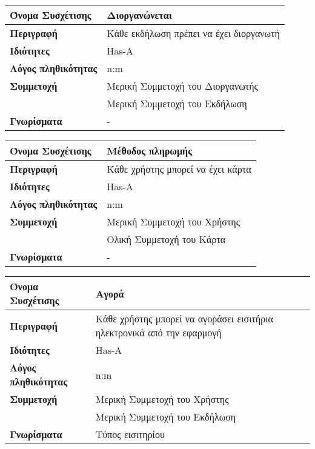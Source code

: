 \begin{center}
\begin{tabular}[]{|p{4cm}|p{10cm}|}
  \hline
  \textbf{Όνομα Συσχέτισης} & Διοργανώνεται\\  \hline
  \textbf{Περιγραφή} & Κάθε εκδήλωση πρέπει να έχει διοργανωτή\\ \hline
  \textbf{Ιδιότητες} & Has-A \\ \hline
  \textbf{Λόγος πληθικότητας} & n:m \\ \hline
  \textbf{Συμμετοχή} & Mερική Συμμετοχή του Διοργανωτής \\ \cline{2-2}
                     & Μερική Συμμετοχή του Εκδήλωση \\ \hline
  \textbf{Γνωρίσματα} & - \\ \hline
\end{tabular}
\vspace{0.3 cm}

\begin{tabular}[]{|p{4cm}|p{10cm}|}
  \hline
  \textbf{Όνομα Συσχέτισης} & Μέθοδος πληρωμής\\  \hline
  \textbf{Περιγραφή} & Κάθε χρήστης μπορεί να έχει κάρτα\\ \hline
  \textbf{Ιδιότητες} & Has-A \\ \hline
  \textbf{Λόγος πληθικότητας} & n:m \\ \hline
  \textbf{Συμμετοχή} & Mερική Συμμετοχή του Χρήστης \\ \cline{2-2}
                     & Ολική Συμμετοχή του Κάρτα \\ \hline
  \textbf{Γνωρίσματα} & - \\ \hline
\end{tabular}
\vspace{0.3 cm}


\begin{tabular}[]{|p{4cm}|p{10cm}|}
  \hline
  \textbf{Όνομα Συσχέτισης}   & Αγορά                                                                  \\  \hline
  \textbf{Περιγραφή}          & Κάθε χρήστης μπορεί να αγοράσει εισιτήρια ηλεκτρονικά από την εφαρμογή \\ \hline
  \textbf{Ιδιότητες}          & Has-A                                                                  \\ \hline
  \textbf{Λόγος πληθικότητας} & n:m                                                                    \\ \hline
  \textbf{Συμμετοχή}          & Mερική Συμμετοχή του Χρήστης                                           \\ \cline{2-2}
                              & Μερική Συμμετοχή του Εκδήλωση                                          \\ \hline
  \textbf{Γνωρίσματα}         & Τύπος εισιτηρίου                                                       \\ \hline
\end{tabular}
\vspace{0.3 cm}




\end{center}
